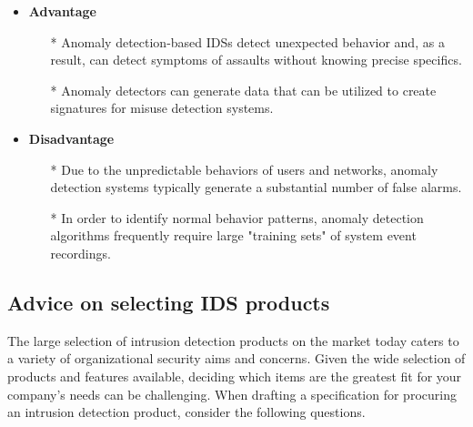 \documentclass[12pt]{article}
\begin{document}
\begin{enumerate}
    
        \begin{itemize}
            \item \textbf{Advantage}
            \begin{itemize}
                \item[*] Anomaly detection-based IDSs detect unexpected behavior and, as a result, can detect symptoms of assaults without knowing precise specifics.
                \item[*] Anomaly detectors can generate data that can be utilized to create signatures for misuse detection systems.
            \end{itemize}
        \item \textbf{Disadvantage}
        \begin{itemize}
            \item[*] Due to the unpredictable behaviors of users and networks, anomaly detection systems typically generate a substantial number of false alarms.
            \item[*] In order to identify normal behavior patterns, anomaly detection algorithms frequently require large "training sets" of system event recordings. 
        \end{itemize}
        \end{itemize}
    \end{enumerate}

    \subsection{Advice on selecting IDS products}
    \par The large selection of intrusion detection products on the market today caters to a variety of organizational security aims and concerns. Given the wide selection of products and features available, deciding which items are the greatest fit for your company's needs can be challenging. When drafting a specification for procuring an intrusion detection product, consider the following questions.
    
\end{document}
